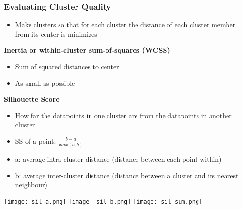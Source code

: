 \subsubsection{Evaluating Cluster Quality}
\begin{itemize}
    \item Make clusters so that for each cluster the distance of each cluster member from its center is minimizes
\end{itemize}
\textbf{Inertia or within-cluster sum-of-squares (WCSS)}
\begin{itemize}
    \item Sum of squared distances to center
    \item As small as possible
\end{itemize}
\textbf{Silhouette Score}
\begin{itemize}
    \item How far the datapoints in one cluster are from the datapoints in another cluster
    \item SS of a point: $\frac{b-a}{max(a,b)}$
    \item a: average intra-cluster distance (distance between each point within)
    \item b: average inter-cluster distance (distance between a cluster and its nearest neighbour)
\end{itemize}
\texttt{[image: sil\_a.png]}
\texttt{[image: sil\_b.png]}
\texttt{[image: sil\_sum.png]}
